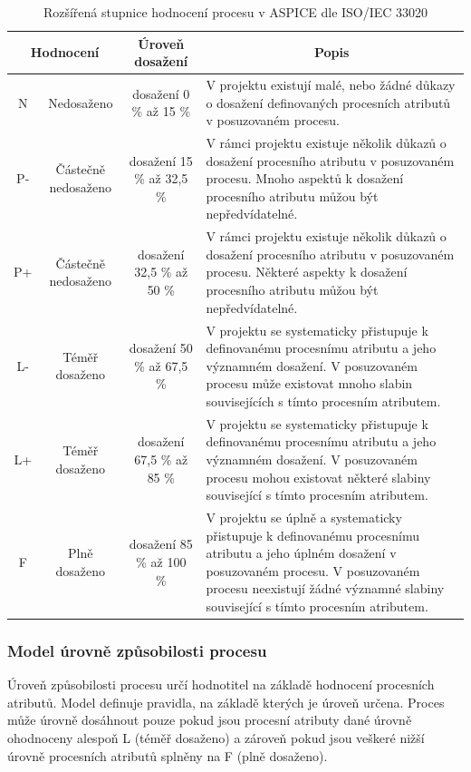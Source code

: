 \documentclass[czech,master,public,dept460,male,cpdeclaration,oneside]{diploma}
\begin{document}
\begin{table}[htp]
\begin{center}
\begin{tabular}{c | c | c | m{6cm}}
\multicolumn{2}{c|}{\textbf{Hodnocení}} & \multicolumn{1}{c|}{\textbf{Úroveň dosažení}} & \multicolumn{1}{c}{\textbf{Popis}} \\ 
\hline
\hline
N  & Nedosaženo & dosažení 0 \% až 15 \% & V projektu existují malé, nebo žádné důkazy o dosažení definovaných procesních atributů v posuzovaném procesu. \\ 
\hline
P- & Částečně nedosaženo & dosažení 15 \% až  32,5 \% & V rámci projektu existuje několik důkazů o dosažení procesního atributu v posuzovaném procesu. Mnoho aspektů k dosažení procesního atributu můžou být nepředvídatelné. \\ 
\hline
P+ & Částečně nedosaženo & dosažení  32,5 \% až 50 \% & V rámci projektu existuje několik důkazů o dosažení procesního atributu v posuzovaném procesu. Některé aspekty k dosažení procesního atributu můžou být nepředvídatelné. \\ 
\hline
L- & Téměř dosaženo & dosažení  50 \% až 67,5 \% & V projektu se systematicky přistupuje k  definovanému procesnímu atributu a jeho významném dosažení. V posuzovaném procesu může existovat mnoho slabin souvisejících s tímto procesním atributem. \\ 
\hline
L+ & Téměř dosaženo  & dosažení  67,5 \% až 85 \% & V projektu se systematicky přistupuje k definovanému procesnímu atributu a jeho významném dosažení. V posuzovaném procesu mohou existovat některé slabiny související s tímto procesním atributem. \\ 
\hline
F  & Plně dosaženo & dosažení  85 \% až 100 \% & V projektu se úplně a systematicky přistupuje k definovanému procesnímu atributu a jeho úplném dosažení v posuzovaném procesu. V posuzovaném procesu neexistují žádné významné slabiny související s tímto procesním atributem. \\ 
\end{tabular}
\caption{Rozšířená stupnice hodnocení procesu v ASPICE dle ISO/IEC 33020 \cite{ref:aspice_download_1523}}
\label{tab:aspice_rating_scale}
\end{center}
\end{table}

\subsubsection{Model úrovně způsobilosti procesu}
Úroveň způsobilosti procesu určí hodnotitel na základě hodnocení procesních atributů. Model definuje  pravidla, na základě kterých je úroveň určena. Proces může úrovně dosáhnout pouze pokud jsou procesní atributy dané úrovně ohodnoceny alespoň L (téměř dosaženo) a zároveň pokud jsou veškeré nižší úrovně procesních atributů splněny na F (plně dosaženo).
\end{document}
